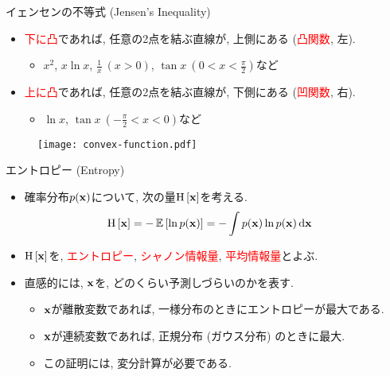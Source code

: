 \documentclass[dvipdfmx,notheorems,t]{beamer}
\begin{document}
\begin{frame}{イェンセンの不等式 (Jensen's Inequality)}
\begin{itemize}
  \item \textcolor{red}{下に凸}であれば, 任意の2点を結ぶ直線が, 上側にある (\textcolor{red}{凸関数}, 左).
  \begin{itemize}
    \item $x^2$, $x \ln x$, $\frac{1}{x} \ (x > 0)$, $\tan x \ (0 < x < \frac{\pi}{2})$など
  \end{itemize}
  \item \textcolor{red}{上に凸}であれば, 任意の2点を結ぶ直線が, 下側にある (\textcolor{red}{凹関数}, 右).
  \begin{itemize}
    \item $\ln x$, $\tan x \ (-\frac{\pi}{2} < x < 0)$など
  \end{itemize}
\end{itemize}

\begin{figure}
  \centering
  \texttt{[image: convex-function.pdf]}
\end{figure}
\end{frame}

\begin{frame}{エントロピー (Entropy)}
\begin{itemize}
  \item 確率分布$p(\vb{x})$について, 次の量$\operatorname{H} \left[ \vb{x} \right]$を考える.
  \begin{align*}
    \operatorname{H} \left[ \vb{x} \right] &= -\operatorname{\mathbb{E}} \left[ \ln p(\vb{x}) \right] = - \int p(\vb{x}) \ln p(\vb{x}) \dd{\vb{x}}
  \end{align*}
  \item $\operatorname{H} \left[ \vb{x} \right]$を, \textcolor{red}{エントロピー}, \textcolor{red}{シャノン情報量}, \textcolor{red}{平均情報量}とよぶ.
  \item 直感的には, $\vb{x}$を, どのくらい予測しづらいのかを表す.
  \begin{itemize}
    \item $\vb{x}$が離散変数であれば, 一様分布のときにエントロピーが最大である.
    \item $\vb{x}$が連続変数であれば, 正規分布 (ガウス分布) のときに最大.
    \item この証明には, 変分計算が必要である.
  \end{itemize}
\end{itemize}
\end{frame}
\end{document}
